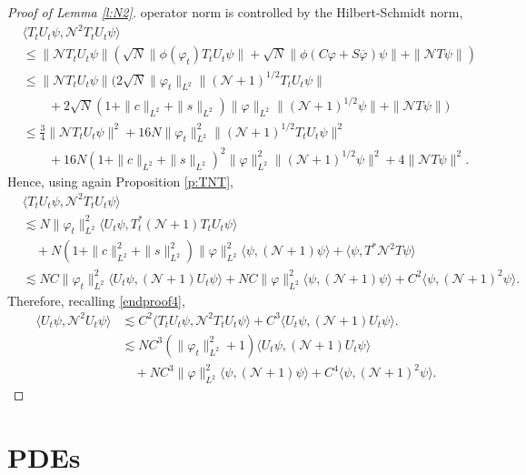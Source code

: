 \documentclass[11pt,a4paper]{scrartcl} %
\newcommand{\N}{\mathcal{N}}
\begin{document}
\begin{proof}[Proof of Lemma \ref{l:N2}]
  operator norm is controlled by the Hilbert-Schmidt norm,
  \begin{align*}
    & \langle T_t U_t \psi, \N^2 T_t U_t \psi \rangle \\
    & \le \| \N T_t U_t \psi \| ( \sqrt{N} \| \phi(\varphi_t) T_t U_t \psi \|
    + \sqrt{N} \| \phi(C \varphi + S \overline{\varphi}) \psi \| + \| \N T
    \psi \| ) \\
    & \le \| \N T_t U_t \psi \| ( 2 \sqrt{N} \| \varphi_t \|_{L^2} \|
    (\N+1)^{1/2} T_t U_t \psi \| \\
    & \qquad + 2 \sqrt{N} ( 1 + \| c \|_{L^2} + \| s \|_{L^2}) \| \varphi
    \|_{L^2} \| (\N+1)^{1/2} \psi \| + \| \N T \psi \| ) \\
    & \le \frac{3}{4} \| \N T_t U_t \psi \|^2 + 16N \| \varphi_t \|_{L^2}^2
    \| (\N + 1)^{1/2} T_t U_t \psi \|^2 \\
    & \qquad + 16N (1 + \| c \|_{L^2} + \| s \|_{L^2})^2 \| \varphi \|_{L^2}^2
    \| (\N + 1)^{1/2} \psi \|^2 + 4\| \N T \psi \|^2.
  \end{align*}
  Hence, using again Proposition \ref{p:TNT},
  \begin{align*}
    & \langle T_t U_t \psi, \N^2 T_t U_t \psi \rangle \\
    & \apprle N \| \varphi_t \|_{L^2}^2 \langle U_t \psi, T_t^* (\N+1) T_t U_t
    \psi \rangle \\
    & \quad + N (1 + \| c \|_{L^2}^2 + \| s \|_{L^2}^2) \| \varphi
    \|_{L^2}^2 \langle \psi, (\N+1) \psi \rangle + \langle \psi, T^* \N^2 T
    \psi \rangle \\
    & \apprle N C \| \varphi_t \|_{L^2}^2 \langle U_t \psi, (\N+1) U_t \psi
    \rangle + N C \| \varphi \|_{L^2}^2 \langle \psi, (\N+1) \psi \rangle +
    C^2 \langle \psi, (\N+1)^2 \psi \rangle.
  \end{align*}
  Therefore, recalling \eqref{endproof4},
  \begin{align*}
    \langle U_t \psi, \N^2 U_t \psi \rangle 
    & \apprle C^2 \langle T_t U_t \psi, \N^2 T_t U_t \psi \rangle + C^3
    \langle U_t \psi, (\N+1) U_t \psi \rangle. \\
    & \apprle N C^3 (\| \varphi_t \|_{L^2}^2+1) \langle U_t \psi, (\N+1) U_t
    \psi \rangle \\
    & \quad + N C^3 \| \varphi \|_{L^2}^2 \langle \psi, (\N+1) \psi \rangle +
    C^4 \langle \psi, (\N+1)^2 \psi \rangle.
  \end{align*}
\end{proof}


\section{PDEs}
\end{document}
